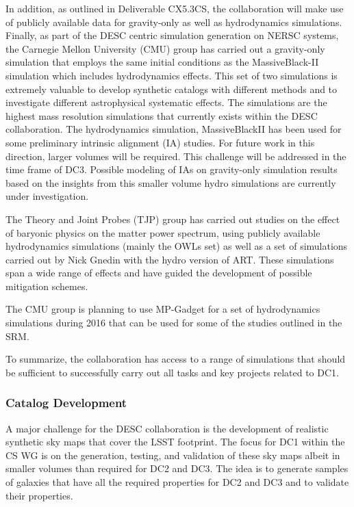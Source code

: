 In addition, as outlined in Deliverable CX5.3CS, the collaboration will make use of publicly available data for gravity-only as well as hydrodynamics simulations. Finally, as part of the DESC centric simulation generation on NERSC systems, the Carnegie Mellon University (CMU) group has carried out a gravity-only simulation that employs the same initial conditions as the MassiveBlack-II simulation which includes hydrodynamics effects. This set of two simulations is extremely valuable to develop synthetic catalogs with different methods and to investigate different astrophysical systematic effects. The simulations are the highest mass resolution simulations that currently exists within the DESC collaboration. The hydrodynamics simulation, MassiveBlackII has been used for some preliminary intrinsic alignment (IA) studies. For future work in this direction, larger volumes will be required. This challenge will be addressed in the time frame of DC3. Possible modeling of IAs on gravity-only simulation results based on the insights from this smaller volume hydro simulations are currently under investigation. 

The Theory and Joint Probes (TJP) group has carried out studies on the effect of baryonic physics on the matter power spectrum, using publicly available hydrodynamics simulations (mainly the OWLs set) as well as a set of simulations carried out by Nick Gnedin with the hydro version of ART. These simulations span a wide range of effects and have guided the development of possible mitigation schemes.

The CMU group is planning to use MP-Gadget for a set of hydrodynamics simulations during 2016 that can be used for some of the studies outlined in the SRM.

To summarize, the collaboration has access to a range of simulations that should be sufficient to successfully carry out all tasks and key projects related to DC1. 

\subsubsection{Catalog Development}
\label{sec:keysims:dc1:dev}

A major challenge for the DESC collaboration is the development of realistic synthetic sky maps that cover the LSST footprint. The focus for DC1 within the CS WG is on the generation, testing, and validation of these sky maps albeit in smaller volumes than required for DC2 and DC3. The idea is to generate samples of galaxies that have all the required properties for DC2 and DC3 and to validate their properties. 

